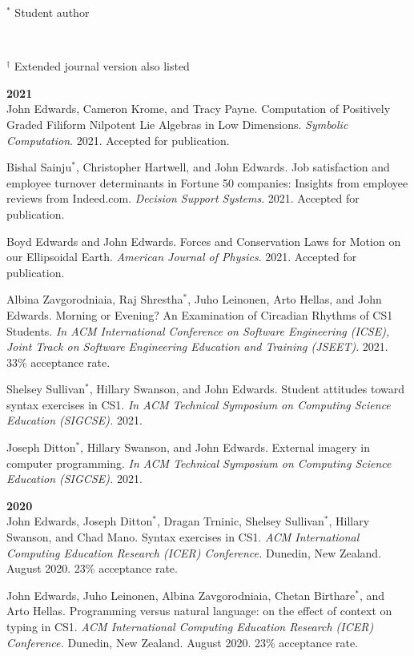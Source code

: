 \documentclass[margin,line]{res}
\begin{document}
\begin{resume}
\begin{footnotesize}$^*$ Student author\end{footnotesize}
\\\begin{footnotesize}$^\dagger$ Extended journal version also listed\end{footnotesize}

\textbf{2021} \\
John Edwards, Cameron Krome, and Tracy Payne. Computation of Positively Graded Filiform Nilpotent Lie Algebras in Low Dimensions. \textit{Symbolic Computation}. 2021. Accepted for publication.

Bishal Sainju$^*$, Christopher Hartwell, and John Edwards. Job satisfaction and employee turnover determinants in Fortune 50 companies: Insights from employee reviews from Indeed.com. \textit{Decision Support Systems}. 2021. Accepted for publication.

Boyd Edwards and John Edwards. Forces and Conservation Laws for Motion on our Ellipsoidal Earth. \textit{American Journal of Physics}. 2021. Accepted for publication.

Albina Zavgorodniaia, Raj Shrestha$^*$, Juho Leinonen, Arto Hellas, and John Edwards. Morning or Evening? An Examination of Circadian Rhythms of CS1 Students. \textit{In ACM International Conference on Software Engineering (ICSE), Joint Track on Software Engineering Education and Training (JSEET)}. 2021. 33\% acceptance rate.

Shelsey Sullivan$^*$, Hillary Swanson, and John Edwards. Student attitudes toward syntax exercises in CS1. \textit{In ACM Technical Symposium on Computing Science Education (SIGCSE).} 2021.

Joseph Ditton$^*$, Hillary Swanson, and John Edwards. External imagery in computer programming. \textit{In ACM Technical Symposium on Computing Science Education (SIGCSE).} 2021.

\textbf{2020} \\
John Edwards, Joseph Ditton$^*$, Dragan Trninic, Shelsey Sullivan$^*$, Hillary Swanson, and Chad Mano. Syntax exercises in CS1. \textit{ACM International Computing Education Research (ICER) Conference.} Dunedin, New Zealand. August 2020. 23\% acceptance rate.

John Edwards, Juho Leinonen, Albina Zavgorodniaia, Chetan Birthare$^*$, and Arto Hellas. Programming versus natural language: on the effect of context on typing in CS1. \textit{ACM International Computing Education Research (ICER) Conference.} Dunedin, New Zealand. August 2020. 23\% acceptance rate.


\end{resume}
\end{document}
